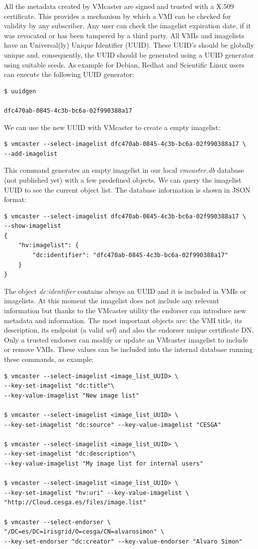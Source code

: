 \documentclass{cai}
\begin{document}
All the metadata created by VMcaster are signed and trusted with a X.509 certificate.
This provides a mechanism by which a VMI can be checked for validity by any subscriber. Any user can check the imagelist expiration date, if it was revocated or has been tampered by a third party.
All VMIs and imagelists have an Universal(ly) Unique Identifier (UUID). These UUID's should be globally unique and, consequently, the UUID should be generated using a UUID generator using suitable seeds. As example for Debian, Redhat and Scientific Linux users can execute the following UUID generator:
\begin{verbatim}
$ uuidgen

dfc470ab-0845-4c3b-bc6a-02f990388a17
\end{verbatim}
We can use the new UUID with VMcaster to create a empty imagelist:
\begin{verbatim}
$ vmcaster --select-imagelist dfc470ab-0845-4c3b-bc6a-02f990388a17 \
--add-imagelist
\end{verbatim}
This command generates an empty imagelist in our local \textit{vmcaster.db} database (not published yet) with a few predefined objects. We can query the imagelist UUID to see the current object list.
The database information is shown in JSON format:
\begin{verbatim}
$ vmcaster --select-imagelist dfc470ab-0845-4c3b-bc6a-02f990388a17 \
--show-imagelist
{
    "hv:imagelist": {
        "dc:identifier": "dfc470ab-0845-4c3b-bc6a-02f990388a17"
    }
}
\end{verbatim}
The object \textit{dc:identifier} contains always an UUID and it is included in VMIs or imagelists. 
At this moment the imagelist does not include any relevant information but thanks to the VMcaster utility the endorser can introduce new metadata and information.
The most important objects are: the VMI title, its description, its endpoint (a valid \textit{url}) and also the endorser unique certificate DN. Only a trusted endorser can modify or update an VMcaster imagelist to include or remove VMIs. 
These values can be included into the internal database running these commands, as example:
\begin{verbatim}
$ vmcaster --select-imagelist <image_list_UUID> \
--key-set-imagelist "dc:title"\ 
--key-value-imagelist "New image list"

$ vmcaster --select-imagelist <image_list_UUID> \ 
--key-set-imagelist "dc:source" --key-value-imagelist "CESGA"

$ vmcaster --select-imagelist <image_list_UUID> \ 
--key-set-imagelist "dc:description"\ 
--key-value-imagelist "My image list for internal users"

$ vmcaster --select-imagelist <image_list_UUID> \ 
--key-set-imagelist "hv:uri" --key-value-imagelist \ 
"http://Cloud.cesga.es/files/image.list"

$ vmcaster --select-endorser \ 
"/DC=es/DC=irisgrid/O=cesga/CN=alvarosimon" \
--key-set-endorser "dc:creator" --key-value-endorser "Alvaro Simon"
\end{verbatim}
\end{document}
